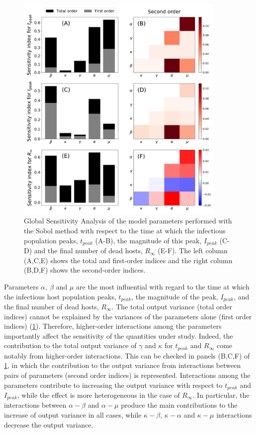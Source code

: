 \begin{figure}[H]
    \centering
    \includegraphics[width=0.9\textwidth]{Figures/GSA.pdf}
    \caption{Global Sensitivity Analysis of the model parameters performed
        with the Sobol method with respect to the time at which the infectious
        population peaks, $t_{peak}$ (A-B), the magnitude of this peak,
        $I_{peak}$
        (C-D) and the final number of dead hosts, $R_{\infty}$ (E-F). The left
        column
        (A,C,E) shows the total and first-order indices and the right column
        (B,D,F)
        shows the second-order indices.}
    \label{fig:GSA}
\end{figure}

Parameters $\alpha, \ \beta$ and $\mu$ are the most influential with regard
to the time at which the infectious host population peaks, $t_{peak}$, the
magnitude of the peak, $I_{peak}$, and the final number of dead hosts,
$R_{\infty}$. The total output variance (total order indices) cannot be
explained by the variances of the parameters alone (first order indices)
(\cref{fig:GSA}). Therefore, higher-order interactions among the parameters
importantly affect the sensitivity of the quantities under study. Indeed, the
contribution to the total output variance of $\gamma$ and $\kappa$ for
$t_{peak}$ and $R_{\infty}$ come notably from higher-order interactions. This
can be checked in panels (B,C,F) of \cref{fig:GSA}, in which the contribution
to the output variance from interactions between pairs of parameters (second
order indices) is represented. Interactions among the parameters contribute to
increasing the output variance with respect to $t_{peak}$ and $I_{peak}$, while
the effect is more heterogeneous in the case of $R_{\infty}$. In particular,
the interactions between $\alpha-\beta$ and $\alpha-\mu$ produce the main
contributions to the increase of output variance in all cases, while
$\kappa-\beta$, $\kappa-\alpha$ and $\kappa-\mu$ interactions decrease the
output variance.

